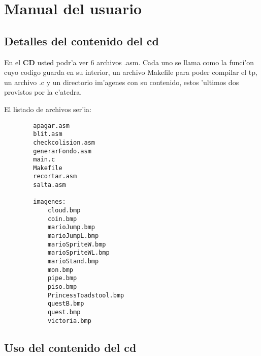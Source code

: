 \section{Manual del usuario}

\subsection{Detalles del contenido del cd}

	En el \textbf{CD} usted podr'a ver 6 archivos .asm. Cada uno se llama como
la funci'on cuyo codigo guarda en su interior, un archivo Makefile para poder
compilar el tp, un archivo .c y un directorio im'agenes con su contenido, estos
'ultimos dos provistos por la c'atedra.

	El listado de archivos ser'ia:
\begin{verbatim}
		apagar.asm
		blit.asm
		checkcolision.asm
		generarFondo.asm
		main.c
		Makefile
		recortar.asm
		salta.asm

		imagenes:
			cloud.bmp
			coin.bmp
			marioJump.bmp
			marioJumpL.bmp
			marioSpriteW.bmp
			marioSpriteWL.bmp
			marioStand.bmp
			mon.bmp
			pipe.bmp
			piso.bmp
			PrincessToadstool.bmp
			questB.bmp
			quest.bmp
			victoria.bmp
\end{verbatim}

\subsection{Uso del contenido del cd}
